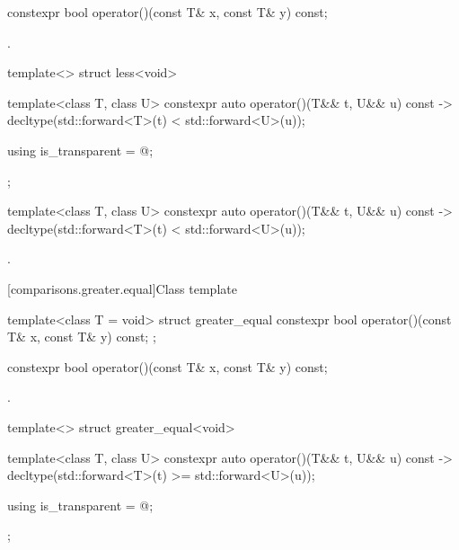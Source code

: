 %
\begin{itemdecl}
constexpr bool operator()(const T& x, const T& y) const;
\end{itemdecl}

\begin{itemdescr}
\pnum
\returns
{}.
\end{itemdescr}

%
\begin{itemdecl}
template<> struct less<void> {
  template<class T, class U> constexpr auto operator()(T&& t, U&& u) const
    -> decltype(std::forward<T>(t) < std::forward<U>(u));

  using is_transparent = @\unspec@;
};
\end{itemdecl}

%
\begin{itemdecl}
template<class T, class U> constexpr auto operator()(T&& t, U&& u) const
    -> decltype(std::forward<T>(t) < std::forward<U>(u));
\end{itemdecl}

\begin{itemdescr}
\pnum
\returns
{}.
\end{itemdescr}

[comparisons.greater.equal]{Class template }

%
\begin{itemdecl}
template<class T = void> struct greater_equal {
  constexpr bool operator()(const T& x, const T& y) const;
};
\end{itemdecl}

%
\begin{itemdecl}
constexpr bool operator()(const T& x, const T& y) const;
\end{itemdecl}

\begin{itemdescr}
\pnum
\returns
{}.
\end{itemdescr}

%
\begin{itemdecl}
template<> struct greater_equal<void> {
  template<class T, class U> constexpr auto operator()(T&& t, U&& u) const
    -> decltype(std::forward<T>(t) >= std::forward<U>(u));

  using is_transparent = @\unspec@;
};
\end{itemdecl}


